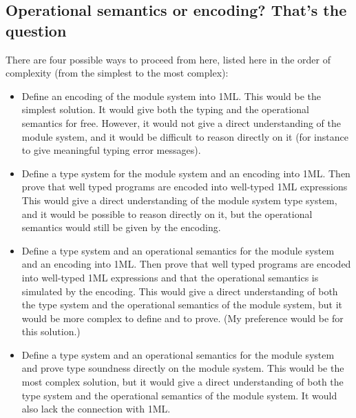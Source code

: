 \documentclass[a4paper,10pt]{article}
\begin{document}
\subsection{Operational semantics or encoding? That's the question}

There are four possible ways to proceed from here, listed here in the order of complexity (from the simplest to the most complex):
\begin{itemize}
  \item Define an encoding of the module system into 1ML. This would be the simplest solution. It would give both the typing and the operational semantics for free. However, it would not give a direct understanding of the module system, and it would be difficult to reason directly on it (for instance to give meaningful typing error messages).
  \item Define a type system for the module system and an encoding into 1ML. Then prove that well typed programs are encoded into well-typed 1ML expressions This would give a direct understanding of the module system type system, and it would be possible to reason directly on it, but the operational semantics would still be given by the encoding.
  \item Define a type system and an operational semantics for the module system and an encoding into 1ML. Then prove that well typed programs are encoded into well-typed 1ML expressions and that the operational semantics is simulated by the encoding. This would give a direct understanding of both the type system and the operational semantics of the module system, but it would be more complex to define and to prove. (My preference would be for this solution.)
  \item Define a type system and an operational semantics for the module system and prove type soundness directly on the module system. This would be the most complex solution, but it would give a direct understanding of both the type system and the operational semantics of the module system. It would also lack the connection with 1ML.
\end{itemize}
\end{document}
